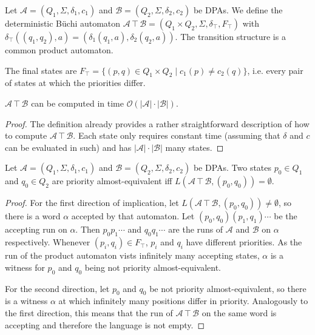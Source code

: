 \begin{defn}
	Let $\mathcal{A} = (Q_1, \Sigma, \delta_1, c_1)$ and $\mathcal{B} = (Q_2, \Sigma, \delta_2, c_2)$ be DPAs. We define the deterministic Büchi automaton $\mathcal{A} \intercal \mathcal{B} = (Q_1 \times Q_2, \Sigma, \delta_\intercal, F_\intercal)$ with $\delta_\intercal((q_1, q_2), a) = (\delta_1(q_1, a), \delta_2(q_2, a))$. The transition structure is a common product automaton.
	
	The final states are $F_\intercal = \{ (p, q) \in Q_1 \times Q_2 \mid c_1(p) \neq c_2(q) \}$, i.e. every pair of states at which the priorities differ. 
\end{defn}

\begin{lem}
	$\mathcal{A} \intercal \mathcal{B}$ can be computed in time $\mathcal{O}(|\mathcal{A}| \cdot |\mathcal{B}|)$.
	\label{lem:general:intercal_runtime}
\end{lem}

\begin{proof}
	The definition already provides a rather straightforward description of how to compute $\mathcal{A} \intercal \mathcal{B}$. Each state only requires constant time (assuming that $\delta$ and $c$ can be evaluated in such) and has $|\mathcal{A}| \cdot |\mathcal{B}|$ many states.
\end{proof}

\begin{lem}
	Let $\mathcal{A} = (Q_1, \Sigma, \delta_1, c_1)$ and $\mathcal{B} = (Q_2, \Sigma, \delta_2, c_2)$ be DPAs. Two states $p_0 \in Q_1$ and $q_0 \in Q_2$ are priority almost-equivalent iff $L(\mathcal{A} \intercal \mathcal{B}, (p_0, q_0)) = \emptyset$. 
	\label{lem:general:intercal_prioalmostequiv}
\end{lem}

\begin{proof}
	For the first direction of implication, let $L(\mathcal{A} \intercal \mathcal{B}, (p_0, q_0)) \neq \emptyset$, so there is a word $\alpha$ accepted by that automaton. Let $(p_0, q_0) (p_1, q_1) \cdots$ be the accepting run on $\alpha$. Then $p_0 p_1 \cdots$ and $q_0 q_1 \cdots$ are the runs of $\mathcal{A}$ and $\mathcal{B}$ on $\alpha$ respectively. Whenever $(p_i, q_i) \in F_\intercal$, $p_i$ and $q_i$ have different priorities. As the run of the product automaton vists infinitely many accepting states, $\alpha$ is a witness for $p_0$ and $q_0$ being not priority almost-equivalent.
	
	For the second direction, let $p_0$ and $q_0$ be not priority almost-equivalent, so there is a witness $\alpha$ at which infinitely many positions differ in priority. Analogously to the first direction, this means that the run of $\mathcal{A} \intercal \mathcal{B}$ on the same word is accepting and therefore the language is not empty.
\end{proof}

